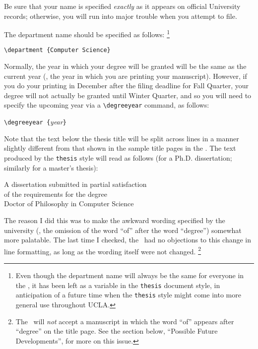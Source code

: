Be sure that your name is specified {\em exactly\/}
as it appears on official University records;
otherwise, you will run into major trouble
when you attempt to file.

The department name should be specified as follows:%
\footnote {Even though the department name
will always be the same
for everyone in the \csd,
it has been left as a variable
in the \verb+thesis+ document style,
in anticipation of a future time
when the \verb+thesis+ style might come
into more general use throughout UCLA.}

\begin {center}
\verb+\department {Computer Science}+
\end {center}

Normally, the year in which your degree will be granted
will be the same as the current year
(\ie, the year in which you are printing your manuscript).
However, if you do your printing in December
after the filing deadline for Fall Quarter,
your degree will not actually be granted until Winter Quarter,
and so you will need to specify the upcoming year
via a \verb+\degreeyear+ command, as follows:

\begin {center}
\verb+\degreeyear {+{\sl year\/}\verb+}+
\end {center}

Note that the text below the thesis title will be split across lines
in a manner slightly different from that shown in the sample title
pages in the \regs.
The text produced by the \verb+thesis+ style will read as follows
(for a Ph.D. dissertation; similarly for a master's thesis):

\begin {center}
A dissertation submitted in partial satisfaction \\
of the requirements for the degree \\
Doctor of Philosophy in Computer Science
\end {center}

The reason I did this was to make the awkward wording specified by
the university (\ie, the omission of the word ``of'' after the
word ``degree'') somewhat more palatable.
The last time I checked, the \tdadvisor\ had no objections to
this change in line formatting, as long as the wording itself were
not changed.%
\footnote {The \tdadvisor\ will {\em not\/} accept a manuscript
in which the word ``of'' appears after ``degree'' on the title page.
See the section below, ``Possible Future Developments'',
for more on this issue.}

